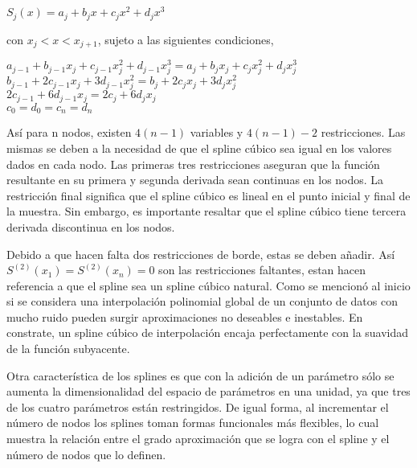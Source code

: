 \begin{center}

$\displaystyle{S_{j}(x) = a_{j} + b_{j}x +c_{j}x^2 +d_{j}x^3}$
\end{center}


\vspace{0.5cm}

\noindent con $x_{j}<x<x_{j+1}$, sujeto a las siguientes condiciones,\\


\begin{center}

$\displaystyle{a_{j-1} + b_{j-1}x_{j} +c_{j-1}x_{j}^2 +d_{j-1}x_{j}^3 = a_{j} + b_{j}x_{j} +c_{j}x_{j}^2 +d_{j}x_{j}^3}$\\
$\displaystyle{ b_{j-1} +2c_{j-1}x_{j} +3d_{j-1}x_{j}^2 = b_{j} +2c_{j}x_{j} +3d_{j}x_{j}^2}$\\
$\displaystyle{ 2c_{j-1} +6d_{j-1}x_{j} = 2c_{j} +6d_{j}x_{j}}$\\
$\displaystyle{ c_{0} = d_{0} = c_{n} =d_{n}}$

\end{center}


\hspace{0.4cm}As\'i para n nodos, existen $4(n-1)$ variables y $4(n-1)-2$ restricciones. Las mismas se deben a la necesidad de que el spline c\'ubico sea igual en los valores dados en cada nodo. Las primeras tres restricciones aseguran que la funci\'on resultante en su primera y segunda derivada sean continuas en los nodos. La restricci\'on final significa que el spline c\'ubico es lineal en el punto inicial y final de la muestra. Sin embargo, es importante resaltar que el spline c\'ubico tiene tercera derivada discontinua en los nodos.

\hspace{0.4cm}Debido a que hacen falta dos restricciones de borde, estas se deben a\~nadir. As\'i  $S^{(2)}(x_{1}) = S^{(2)}(x_{n}) = 0$ son las restricciones faltantes, estan hacen referencia a que el spline sea un spline c\'ubico natural. Como se mencion\'o al inicio si se considera una interpolaci\'on polinomial global de un conjunto de datos con mucho ruido pueden surgir aproximaciones no deseables e inestables. En constrate, un spline c\'ubico de interpolaci\'on encaja perfectamente con la suavidad de la funci\'on subyacente.

\vspace{0.5cm}

\hspace{0.4cm} Otra caracter\'istica de los splines es que con la adici\'on de un par\'ametro s\'olo se aumenta la dimensionalidad del espacio de par\'ametros en una unidad, ya que tres de los cuatro par\'ametros est\'an restringidos. De igual forma, al incrementar el n\'umero de nodos los splines toman formas funcionales m\'as flexibles, lo cual muestra la relaci\'on entre el grado aproximaci\'on que se logra con el spline y el n\'umero de nodos que lo definen.

